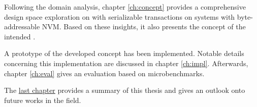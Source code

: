 
Following the domain analysis, chapter \ref{ch:concept} provides a comprehensive
design space exploration on \kvsp with serializable transactions on systems with
byte-addressable \ac{NVM}. Based on these insights, it also presents the concept
of the intended \kvs.

A prototype of the developed concept has been implemented. Notable details
concerning this implementation are discussed in chapter \ref{ch:impl}.
Afterwards, chapter \ref{ch:eval} gives an evaluation based on microbenchmarks.

The \hyperref[ch:summary]{last chapter} provides a summary of this thesis and
gives an outlook onto future works in the field.
